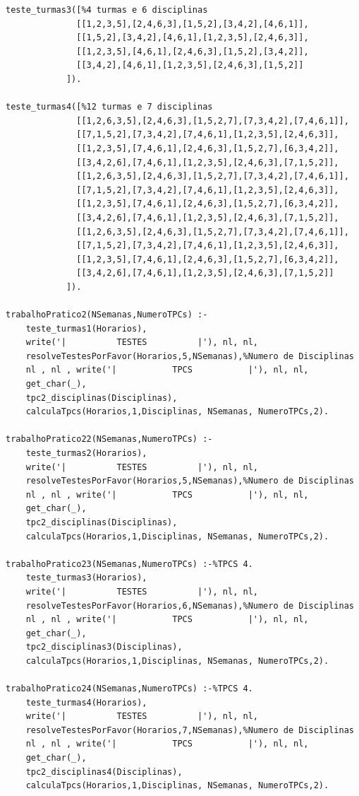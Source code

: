 \documentclass{llncs}
\newenvironment{changemargin}[2]{%
\begin{list}{}{%
\setlength{\topsep}{0pt}%
\setlength{\leftmargin}{#1}%
\setlength{\rightmargin}{#2}%
\setlength{\listparindent}{\parindent}%
\setlength{\itemindent}{\parindent}%
\setlength{\parsep}{\parskip}%
}%
\item[]}{
\end{list}}
\begin{document}
\begin{changemargin}{-3cm}{-4cm}
\begin{verbatim}
teste_turmas3([%4 turmas e 6 disciplinas
              [[1,2,3,5],[2,4,6,3],[1,5,2],[3,4,2],[4,6,1]],
              [[1,5,2],[3,4,2],[4,6,1],[1,2,3,5],[2,4,6,3]],
              [[1,2,3,5],[4,6,1],[2,4,6,3],[1,5,2],[3,4,2]],
              [[3,4,2],[4,6,1],[1,2,3,5],[2,4,6,3],[1,5,2]]
            ]).

teste_turmas4([%12 turmas e 7 disciplinas
              [[1,2,6,3,5],[2,4,6,3],[1,5,2,7],[7,3,4,2],[7,4,6,1]],
              [[7,1,5,2],[7,3,4,2],[7,4,6,1],[1,2,3,5],[2,4,6,3]],
              [[1,2,3,5],[7,4,6,1],[2,4,6,3],[1,5,2,7],[6,3,4,2]],
              [[3,4,2,6],[7,4,6,1],[1,2,3,5],[2,4,6,3],[7,1,5,2]],
              [[1,2,6,3,5],[2,4,6,3],[1,5,2,7],[7,3,4,2],[7,4,6,1]],
              [[7,1,5,2],[7,3,4,2],[7,4,6,1],[1,2,3,5],[2,4,6,3]],
              [[1,2,3,5],[7,4,6,1],[2,4,6,3],[1,5,2,7],[6,3,4,2]],
              [[3,4,2,6],[7,4,6,1],[1,2,3,5],[2,4,6,3],[7,1,5,2]],
              [[1,2,6,3,5],[2,4,6,3],[1,5,2,7],[7,3,4,2],[7,4,6,1]],
              [[7,1,5,2],[7,3,4,2],[7,4,6,1],[1,2,3,5],[2,4,6,3]],
              [[1,2,3,5],[7,4,6,1],[2,4,6,3],[1,5,2,7],[6,3,4,2]],
              [[3,4,2,6],[7,4,6,1],[1,2,3,5],[2,4,6,3],[7,1,5,2]]
            ]).

trabalhoPratico2(NSemanas,NumeroTPCs) :-
    teste_turmas1(Horarios),
    write('|          TESTES          |'), nl, nl,
    resolveTestesPorFavor(Horarios,5,NSemanas),%Numero de Disciplinas
    nl , nl , write('|           TPCS           |'), nl, nl,
    get_char(_),
    tpc2_disciplinas(Disciplinas),
    calculaTpcs(Horarios,1,Disciplinas, NSemanas, NumeroTPCs,2).

trabalhoPratico22(NSemanas,NumeroTPCs) :-
    teste_turmas2(Horarios),
    write('|          TESTES          |'), nl, nl,
    resolveTestesPorFavor(Horarios,5,NSemanas),%Numero de Disciplinas
    nl , nl , write('|           TPCS           |'), nl, nl,
    get_char(_),
    tpc2_disciplinas(Disciplinas),
    calculaTpcs(Horarios,1,Disciplinas, NSemanas, NumeroTPCs,2).

trabalhoPratico23(NSemanas,NumeroTPCs) :-%TPCS 4.
    teste_turmas3(Horarios),
    write('|          TESTES          |'), nl, nl,
    resolveTestesPorFavor(Horarios,6,NSemanas),%Numero de Disciplinas
    nl , nl , write('|           TPCS           |'), nl, nl,
    get_char(_),
    tpc2_disciplinas3(Disciplinas),
    calculaTpcs(Horarios,1,Disciplinas, NSemanas, NumeroTPCs,2).

trabalhoPratico24(NSemanas,NumeroTPCs) :-%TPCS 4.
    teste_turmas4(Horarios),
    write('|          TESTES          |'), nl, nl,
    resolveTestesPorFavor(Horarios,7,NSemanas),%Numero de Disciplinas
    nl , nl , write('|           TPCS           |'), nl, nl,
    get_char(_),
    tpc2_disciplinas4(Disciplinas),
    calculaTpcs(Horarios,1,Disciplinas, NSemanas, NumeroTPCs,2).


\end{verbatim}
\end{changemargin}
\end{document}
